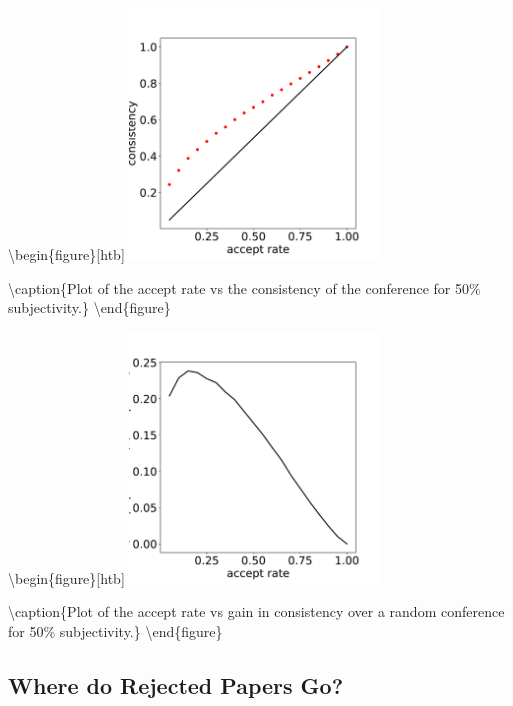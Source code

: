 \textbackslash begin\{figure\}{[}htb{]}
\includegraphics[width=0.50\textwidth]{diagrams/neurips/consistency-vs-accept-rate.pdf}

\textbackslash caption\{Plot of the accept rate vs the consistency of
the conference for 50\% subjectivity.\}
\label{consistency-vs-accept-rate} \textbackslash end\{figure\}

\textbackslash begin\{figure\}{[}htb{]}
\includegraphics[width=0.50\textwidth]{diagrams/neurips/gain-in-consistency.pdf}

\textbackslash caption\{Plot of the accept rate vs gain in consistency
over a random conference for 50\% subjectivity.\}
\label{gain-in-consistency} \textbackslash end\{figure\}

\hypertarget{where-do-rejected-papers-go}{%
\subsection{Where do Rejected Papers
Go?}\label{where-do-rejected-papers-go}}

\begin{flushright}
\end{flushright}

